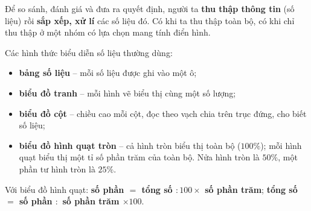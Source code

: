 \newcommand{\stpBars}[6]{%
\begin{tikzpicture}[font=\footnotesize,y=#1cm,x=1cm,>=stealth]
\foreach \n/\v/\d [count=\i] in {#4}{\xdef\stpN{\i}}
\pgfmathsetmacro\stpW{\stpN*1.2+0.1}
\foreach \t in {0,#3,...,#2}{\draw[Line] (0,\t)--(\stpW,\t); \node[left,text=Slate] at (0,\t){$\t$};}
\foreach \n/\v/\d [count=\i] in {#4}{
  \pgfmathsetmacro\stpC{\i*1.2-0.5}
  \fill[tmBlue!65] (\stpC-0.3,0) rectangle (\stpC+0.3,\v);
  \node[above,font=\footnotesize\bfseries,text=Ink] at (\stpC,\v){$\d$};
  \node[below,text=Ink] at (\stpC,0){\n};}
\draw[->,line width=0.8pt] (0,0)--([yshift=0.55cm]0,#2);
\draw[->,line width=0.8pt] (0,0)--(\stpW+0.35,0);
\node[above,text=Slate] at ([yshift=0.55cm]0,#2){#5};
\node[right,text=Slate] at (\stpW+0.35,0){#6};
\end{tikzpicture}}
\newcommand{\stpPie}[2][1.5]{%
\begin{tikzpicture}[font=\footnotesize]
\def\stpA{90}
\foreach \v/\t/\c/\n [count=\i] in {#2}{
  \pgfmathsetmacro\stpB{\stpA-3.6*\v}
  \pgfmathsetmacro\stpM{(\stpA+\stpB)/2}
  \pgfmathsetmacro\stpR{0.64*#1}
  \fill[\c] (0,0) -- (\stpA:#1) arc[start angle=\stpA,end angle=\stpB,radius=#1] -- cycle;
  \draw[white,line width=1.2pt] (0,0) -- (\stpA:#1);
  \node[text=Ink,font=\footnotesize\bfseries] at (\stpM:\stpR) {\t};
  \fill[\c] (#1+0.7,#1-0.55*\i+0.1) rectangle ++(0.32,0.32);
  \node[anchor=west,text=Ink,font=\small] at (#1+1.1,#1-0.55*\i+0.26) {\n};
  \global\let\stpA\stpB}
\draw[Slate,line width=0.8pt] (0,0) circle (#1);
\end{tikzpicture}}
\newcommand{\stpIcons}[1]{\foreach \k in {1,...,#1}{\textcolor{tmBlue}{\faBook}\ }}
\begin{knowbox}
Để so sánh, đánh giá và đưa ra quyết định, người ta \textbf{thu thập thông tin} (số liệu) rồi \textbf{sắp xếp, xử lí} các số liệu đó. Có khi ta thu thập toàn bộ, có khi chỉ thu thập ở một nhóm có lựa chọn mang tính điển hình.\par\smallskip
Các hình thức biểu diễn số liệu thường dùng:
\begin{itemize}[leftmargin=1.4em,itemsep=3pt]
\item \textbf{bảng số liệu} -- mỗi số liệu được ghi vào một ô;
\item \textbf{biểu đồ tranh} -- mỗi hình vẽ biểu thị cùng một số lượng;
\item \textbf{biểu đồ cột} -- chiều cao mỗi cột, đọc theo vạch chia trên trục đứng, cho biết số liệu;
\item \textbf{biểu đồ hình quạt tròn} -- cả hình tròn biểu thị toàn bộ ($100\%$); mỗi hình quạt biểu thị một tỉ số phần trăm của toàn bộ. Nửa hình tròn là $50\%$, một phần tư hình tròn là $25\%$.
\end{itemize}
Với biểu đồ hình quạt: \quad \textbf{số phần $=$ tổng số $:100\times$ số phần trăm}; \quad \textbf{tổng số $=$ số phần $:$ số phần trăm $\times100$}.
\end{knowbox}
